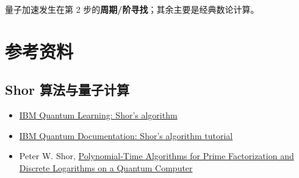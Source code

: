 量子加速发生在第 2 步的\textbf{周期/阶寻找}；其余主要是经典数论计算。

\section{参考资料}

\subsection*{Shor 算法与量子计算}

\begin{itemize}[leftmargin=2em]
  \item \href{https://quantum.cloud.ibm.com/learning/en/courses/fundamentals-of-quantum-algorithms/phase-estimation-and-factoring/shor-algorithm}{IBM Quantum Learning: Shor's algorithm}
  \item \href{https://quantum.cloud.ibm.com/docs/en/tutorials/shors-algorithm}{IBM Quantum Documentation: Shor's algorithm tutorial}
  \item Peter W. Shor, \href{https://arxiv.org/abs/quant-ph/9508027}{Polynomial-Time Algorithms for Prime Factorization and Discrete Logarithms on a Quantum Computer}
\end{itemize}
